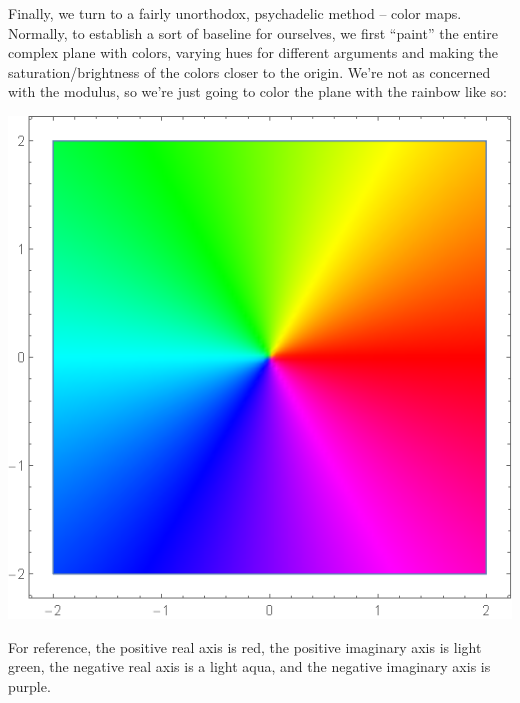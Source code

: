Finally, we turn to a fairly unorthodox, psychadelic method -- color maps. Normally, to establish a sort of baseline for ourselves, we first ``paint'' the entire complex plane with colors, varying hues for different arguments and making the saturation/brightness of the colors closer to the origin. We're not as concerned with the modulus, so we're just going to color the plane with the rainbow like so:
\begin{center}
    \includegraphics[scale=0.25]{images/colorbase.png}
\end{center}

For reference, the positive real axis is red, the positive imaginary axis is light green, the negative real axis is a light aqua, and the negative imaginary axis is purple.

